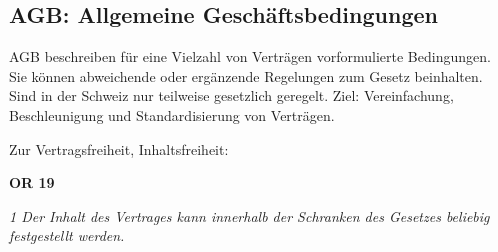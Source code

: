 \subsection{AGB: Allgemeine Geschäftsbedingungen}

AGB beschreiben für eine Vielzahl von Verträgen vorformulierte Bedingungen. Sie können abweichende oder ergänzende Regelungen zum Gesetz beinhalten. Sind in der Schweiz nur teilweise gesetzlich geregelt. Ziel: Vereinfachung, Beschleunigung und Standardisierung von Verträgen.

\noindent
Zur Vertragsfreiheit, Inhaltsfreiheit:

\noindent
\textbf{OR 19}

\textit{1 Der Inhalt des Vertrages kann innerhalb der Schranken des Gesetzes beliebig festgestellt werden.}

